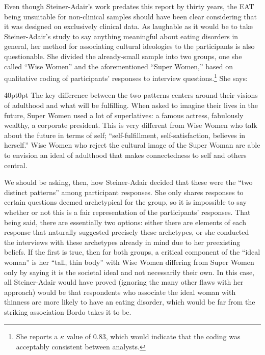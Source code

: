\documentclass[11pt]{article}
\begin{document}
    Even though Steiner-Adair's work predates this report by thirty years, the EAT being unsuitable for non-clinical samples should have been clear considering that it was designed on exclusively clinical data. As laughable as it would be to take Steiner-Adair's study to say anything meaningful about eating disorders in general, her method for associating cultural ideologies to the participants is also questionable. She divided the already-small sample into two groups, one she called ``Wise Women'' and the aforementioned ``Super Women,'' based on qualitative coding of participants' responses to interview questions.\footnote{She reports a $\kappa$ value of $0.83$, which would indicate that the coding was acceptably consistent between analysts.} She says:
    \begin{adjustwidth}{40pt}{0pt}
        The key difference between the two patterns centers around their visions of adulthood and what will be fulfilling. When asked to imagine their lives in the future, Super Women used a lot of superlatives: a famous actress, fabulously wealthy, a corporate president. This is very different from Wise Women who talk about the future in terms of self; ``self-fulfillment, self-satisfaction, believes in herself.'' Wise Women who reject the cultural image of the Super Woman are able to envision an ideal of adulthood that makes connectedness to self and others central.~\autocite[106]{SteinerAdair86}
    \end{adjustwidth}
    We should be asking, then, how Steiner-Adair decided that these were the ``two distinct patterns'' among participant responses. She only shares responses to certain questions deemed archetypical for the group, so it is impossible to say whether or not this is a fair representation of the participants' responses. That being said, there are essentially two options: either there are elements of each response that naturally suggested precisely these archetypes, or she conducted the interviews with these archetypes already in mind due to her preexisting beliefs. If the first is true, then for both groups, a critical component of the ``ideal woman'' is her ``tall, thin body'' with Wise Women differing from Super Women only by saying it is the societal ideal and not necessarily their own\autocite[105]{SteinerAdair86}. In this case, all Steiner-Adair would have proved (ignoring the many other flaws with her approach) would be that respondents who associate the ideal woman with thinness are more likely to have an eating disorder, which would be far from the striking association Bordo takes it to be. 
\end{document}
